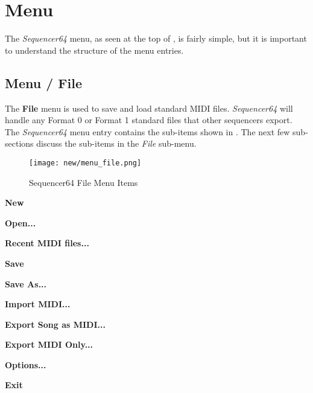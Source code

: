 %
%
%

\section{Menu}
\label{sec:seq64_menu}

   The \textsl{Sequencer64} menu, as seen at the top of
   , is fairly simple, but it is important to
   understand the structure of the menu entries.

\subsection{Menu / File}
\label{subsec:seq64_menu_file}

   The \textbf{File} menu is used to save and load standard MIDI files.
   \textsl{Sequencer64} will handle any Format 0 or
   Format 1 standard files that other sequencers export.
   The \textsl{Sequencer64} menu entry contains the sub-items shown in
   .  The next few sub-sections discuss
   the sub-items in the \textsl{File} sub-menu.

\begin{figure}[H]
   \centering 
   \texttt{[image: new/menu\_file.png]}
   \caption{Sequencer64 File Menu Items}
   \label{fig:seq64_menu_file_items}
\end{figure}

   \begin{enumber}
      \item \textbf{New}
      \item \textbf{Open...}
      \item \textbf{Recent MIDI files...}
      \item \textbf{Save}
      \item \textbf{Save As...}
      \item \textbf{Import MIDI...}
      \item \textbf{Export Song as MIDI...}
      \item \textbf{Export MIDI Only...}
      \item \textbf{Options...}
      \item \textbf{Exit}
   \end{enumber}

